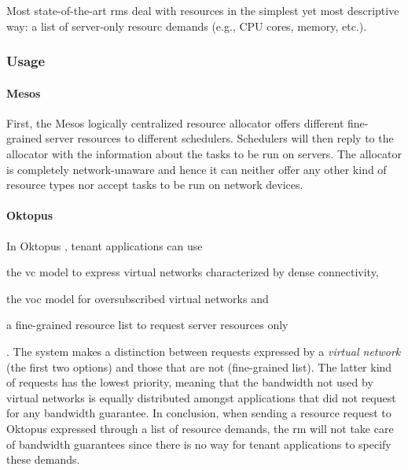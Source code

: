 Most state-of-the-art \glspl{rm} \cite{mesos, borg, omega, kubernetes, yarn} deal with resources in the simplest yet most descriptive way: a list of server-only resourc demands (e.g., CPU cores, memory, etc.).

\subsubsection{Usage}
\paragraph{Mesos \texorpdfstring{\cite{mesos}}{}}
First, the Mesos \cite{mesos} logically centralized resource allocator offers different fine-grained server resources to different schedulers.
Schedulers will then reply to the allocator with the information about the tasks to be run on servers.
The allocator is completely network-unaware and hence it can neither offer any other kind of resource types nor accept tasks to be run on network devices.

\paragraph{Oktopus \texorpdfstring{\cite{oktopus}}{}}
In Oktopus \cite{oktopus}, tenant applications can use
\begin{mylist}
    \item the \gls{vc} model to express virtual networks characterized by dense connectivity,
    \item the \gls{voc} model for oversubscribed virtual networks and
    \item a fine-grained resource list to request server resources only
\end{mylist}.
The system makes a distinction between requests expressed by a \textit{virtual network} (the first two options) and those that are not (fine-grained list).
The latter kind of requests has the lowest priority, meaning that the bandwidth not used by virtual networks is equally distributed amongst applications that did not request for any bandwidth guarantee.
In conclusion, when sending a resource request to Oktopus \cite{oktopus} expressed through a list of resource demands, the \gls{rm} will not take care of bandwidth guarantees since there is no way for tenant applications to specify these demands.

